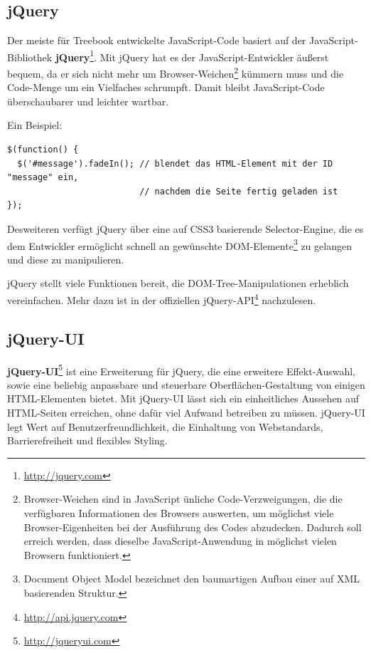 \documentclass[10pt,a4paper]{book}
\begin{document}
\subsection{jQuery}
Der meiste für Treebook entwickelte JavaScript-Code basiert auf der JavaScript-Bibliothek \textbf{jQuery}\footnote{\href{http://jquery.com}{http://jquery.com}}. Mit jQuery hat es der JavaScript-Entwickler äußerst bequem, da er sich nicht mehr um Browser-Weichen\footnote{Browser-Weichen sind in JavaScript ünliche Code-Verzweigungen, die die verfügbaren Informationen des Browsers auswerten, um möglichst viele Browser-Eigenheiten bei der Ausführung des Codes abzudecken. Dadurch soll erreich werden, dass dieselbe JavaScript-Anwendung in möglichst vielen Browsern funktioniert.} kümmern muss und die Code-Menge um ein Vielfaches schrumpft. Damit bleibt JavaScript-Code überschaubarer und leichter wartbar.

Ein Beispiel:

\begin{footnotesize}
\begin{verbatim}
$(function() {
  $('#message').fadeIn(); // blendet das HTML-Element mit der ID "message" ein,
                          // nachdem die Seite fertig geladen ist
});
\end{verbatim}
\end{footnotesize}

Desweiteren verfügt jQuery über eine auf CSS3 basierende Selector-Engine, die es dem Entwickler ermöglicht schnell an gewünschte DOM-Elemente\footnote{Document Object Model bezeichnet den baumartigen Aufbau einer auf XML basierenden Struktur.} zu gelangen und diese zu manipulieren.

jQuery stellt viele Funktionen bereit, die DOM-Tree-Manipulationen erheblich vereinfachen. Mehr dazu ist in der offiziellen jQuery-API\footnote{\href{http://api.jquery.com}{http://api.jquery.com}} nachzulesen.

\subsection{jQuery-UI}
\textbf{jQuery-UI}\footnote{\href{http://jqueryui.com}{http://jqueryui.com}} ist eine Erweiterung für jQuery, die eine erweitere Effekt-Auswahl, sowie eine beliebig anpassbare und steuerbare Oberflächen-Gestaltung von einigen HTML-Elementen bietet.
Mit jQuery-UI lässt sich ein einheitliches Aussehen auf HTML-Seiten erreichen, ohne dafür viel Aufwand betreiben zu müssen. jQuery-UI legt Wert auf Benutzerfreundlichkeit, die Einhaltung von Webstandards, Barrierefreiheit und flexibles Styling.
\end{document}

